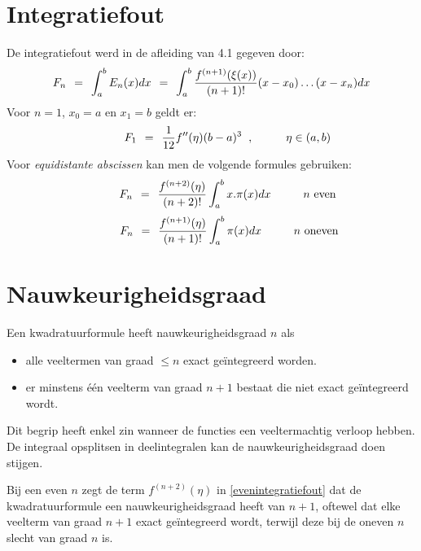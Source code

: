 \documentclass[11pt]{report}
\def \eq {\hspace{1.5mm}=\hspace{1.5mm}}
\def \h {\hspace{2mm}}
\def \H {\hspace{1cm}}
\begin{document}
\section{Integratiefout}
	De integratiefout werd in de afleiding van 4.1 gegeven door:
	$$F_n \eq \int_a^b E_n(x)dx \eq \int_a^b \frac{f^{(n+1)}(\xi(x))}{(n+1)!}(x-x_0)\dots(x-x_n)dx$$
	Voor $n=1$, $x_0 = a$ en $x_1 = b$ geldt er:
	$$\hspace{1cm}F_1 \eq \frac{1}{12} f''(\eta)(b-a)^3\h, \hspace{1cm} \eta \in (a, b)$$
	Voor \textit{equidistante abscissen} kan men de volgende formules gebruiken:
	\begin{equation}\label{evenintegratiefout}
		\H F_n \eq \frac{f^{(n+2)}(\eta)}{(n+2)!}\int_a^b x.\pi(x)dx\H n\text{ even}
	\end{equation}
	\begin{equation}
		\hspace{1.1cm}F_n \eq \frac{f^{(n+1)}(\eta)}{(n+1)!}\int_a^b \pi(x)dx \H n\text{ oneven}
	\end{equation}
	

\section{Nauwkeurigheidsgraad}
	Een kwadratuurformule heeft nauwkeurigheidsgraad $n$ als
	\begin{itemize}
		\item alle veeltermen van graad $\leqslant n$ exact ge\"{i}ntegreerd worden.
		\item er minstens \'{e}\'{e}n veelterm van graad $n+1$ bestaat die niet exact ge\"{i}ntegreerd wordt.
	\end{itemize}
	Dit begrip heeft enkel zin wanneer de functies een veeltermachtig verloop hebben. De integraal opsplitsen in deelintegralen kan de nauwkeurigheidsgraad doen stijgen.
	
	Bij een even $n$ zegt de term $f^{(n+2)}(\eta)$ in \ref{evenintegratiefout} dat de kwadratuurformule een nauwkeurigheidsgraad heeft van $n+1$, oftewel dat elke veelterm van graad $n+1$ exact ge\"{i}ntegreerd wordt, terwijl deze bij de oneven $n$ slecht van graad $n$ is.
	
\end{document}
